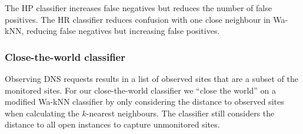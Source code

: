 The HP classifier increases false negatives but reduces the number of false
positives. The HR classifier reduces confusion with one close neighbour in
Wa-kNN, reducing false negatives but increasing false positives.

\subsubsection{Close-the-world classifier}
Observing DNS requests results in a list of observed sites that are a subset of
the monitored sites.
For our close-the-world classifier we ``close the world''
on a modified Wa-kNN classifier by only considering the distance to observed
sites when calculating the $k$-nearest neighbours. The classifier still
considers the distance to all open instances to capture unmonitored sites.

